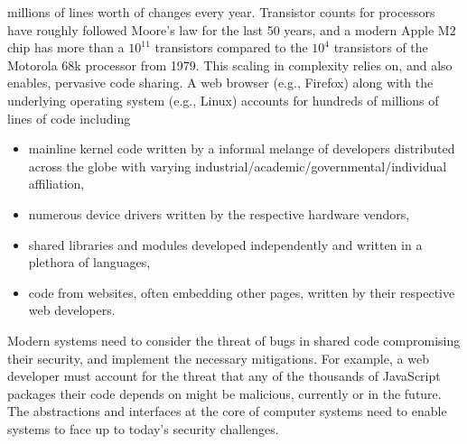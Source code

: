 millions of lines worth of changes every year.
Transistor counts for processors have roughly followed Moore's law for
the last 50 years, and a modern Apple M2 chip has more than a $10^{11}$
transistors compared to the $10^{4}$ transistors of the Motorola 68k processor
from 1979.
This scaling in complexity relies on, and also enables, pervasive code
sharing.
A web browser (e.g., Firefox) along with the underlying operating 
system (e.g., Linux) accounts for hundreds of millions of lines of code
including
\begin{itemize}
      \item mainline kernel code written by a informal melange of developers
            distributed across the globe with varying 
            industrial/academic/governmental/individual affiliation,
      \item numerous device drivers written by the respective hardware 
            vendors,
      \item shared libraries and modules developed independently and 
            written in a plethora of languages,
      \item code from websites, often embedding other pages,
            written by their respective web developers.
\end{itemize}
Modern systems need to consider the threat of bugs in shared code
compromising their security, and implement the necessary mitigations.
For example, a web developer must account for the threat that any of the
thousands of JavaScript packages their code depends on might be malicious,
currently or in the future.
The abstractions and interfaces at the core of computer systems need to
enable systems to face up to today's security challenges.


